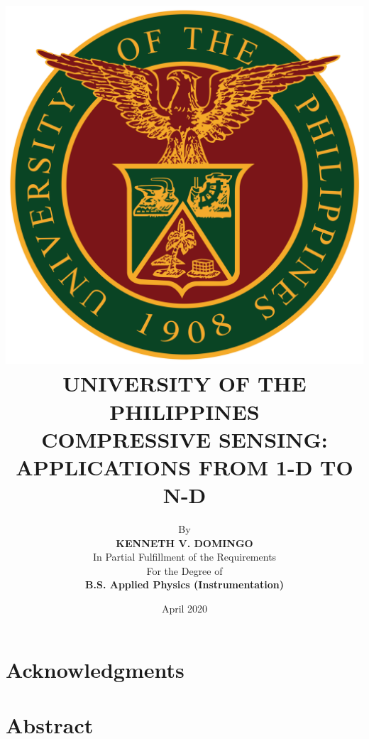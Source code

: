 \documentclass[12pt,oneside]{report}
\begin{document}

\title{
{\includegraphics[scale=0.15]{updlogo.png}} \\
{\normalsize UNIVERSITY OF THE PHILIPPINES} \\ \bigskip
{\bf COMPRESSIVE SENSING: APPLICATIONS FROM 1-D TO N-D}
}

\author{
{By} \\ \bigskip
{\bf KENNETH V. DOMINGO} \\ \bigskip
{\rm In Partial Fulfillment of the Requirements} \\
{\rm For the Degree of} \\
{\bf B.S. Applied Physics (Instrumentation)}
}
\date{\normalsize April 2020}
\maketitle
\thispagestyle{titlestyle}

\chapter*{Acknowledgments}

\chapter*{Abstract}
\end{document}
